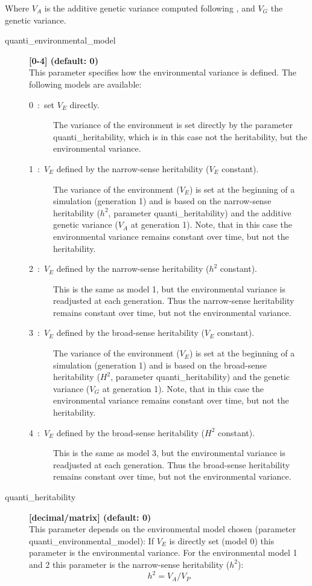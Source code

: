 \documentclass[letterpaper,12pt,oneside]{book}
\begin{document}
Where $V_{A}$ is the additive genetic variance computed following \citep[p85-87]{Lynch_1998}, and $V_{G}$ the genetic variance.  
\begin{description}
\item[quanti\_environmental\_model] \textbf{[0-4] (default: 0)}\\
This parameter specifies how the environmental variance is defined. The following models are available:
\begin{description}
\item [0~:~set $V_{E}$ directly.] The variance of the environment is set directly by the parameter \textsf{quanti\_heritability}, which is in this case not the heritability, but the environmental variance.
\item [1~:~$V_{E}$ defined by the narrow-sense heritability ($V_{E}$ constant).] The variance of the environment ($V_{E}$) is set at the beginning of a simulation (generation 1) and is based on the narrow-sense heritability ($h^{2}$, parameter \textsf{quanti\_heritability}) and the additive genetic variance ($V_{A}$ at generation 1). Note, that in this case the environmental variance remains constant over time, but not the heritability.
\item [2~:~$V_{E}$ defined by the narrow-sense heritability ($h^{2}$ constant).] This is the same as model 1, but the environmental variance is readjusted at each generation. Thus the narrow-sense heritability remains constant over time, but not the environmental variance. 
\item [3~:~$V_{E}$ defined by the broad-sense heritability ($V_{E}$ constant).] The variance of the environment ($V_{E}$) is set at the beginning of a simulation (generation 1) and is based on the broad-sense heritability ($H^{2}$, parameter \textsf{quanti\_heritability}) and the genetic variance ($V_{G}$ at generation 1). Note, that in this case the environmental variance remains constant over time, but not the heritability.
\item [4~:~$V_{E}$ defined by the broad-sense heritability ($H^{2}$ constant).] This is the same as model 3, but the environmental variance is readjusted at each generation. Thus the broad-sense heritability remains constant over time, but not the environmental variance. 
\end{description}

\item[quanti\_heritability] \textbf{[decimal/matrix] (default: 0)}\\
This parameter depends on the environmental model chosen (parameter \linebreak\textsf{quanti\_environmental\_model}): If $V_{E}$ is directly set (model 0) this parameter is the environmental variance. For the environmental model 1 and 2 this parameter is the narrow-sense heritability ($h^{2}$):
	\[h^{2} = V_{A}/V_{P}\]
	

\end{description}
\end{document}
